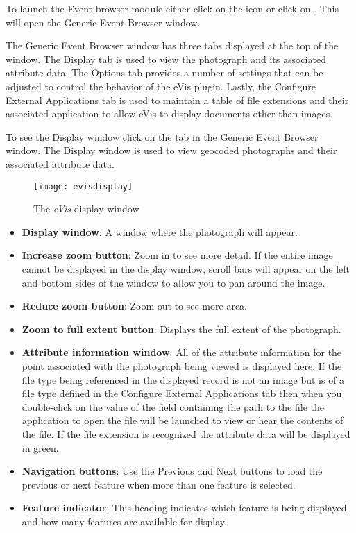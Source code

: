 To launch the Event browser module either click on the 
icon or click on  \arrow {} \arrow
{}. This will open the Generic Event Browser window.

The Generic Event Browser window has three tabs displayed at the top of the window. The Display tab
is used to view the photograph and its associated attribute data. The Options tab provides a number
of settings that can be adjusted to control the behavior of the eVis plugin. Lastly, the Configure
External Applications tab is used to maintain a table of file extensions and their associated
application to allow eVis to display documents other than images.

\label{evis_display_window}

To see the Display window click on the  tab in the Generic Event Browser
window. The Display window is used to view geocoded photographs and their associated attribute data.

\begin{figure}[ht]
   \centering
   \texttt{[image: evisdisplay]}
   \caption{The \emph{eVis} display window \wincaption}\label{evisdisplay}
\end{figure}

\begin{itemize}[label=--]
\item \textbf{Display window}: A window where the photograph will appear.
\item \textbf{Increase zoom button}: Zoom in to see more detail. If the entire image cannot be
displayed in the display window, scroll bars will appear on the left and bottom sides of the window
to allow you to pan around the image.
\item \textbf{Reduce zoom button}: Zoom out to see more area.
\item \textbf{Zoom to full extent button}: Displays the full extent of the photograph.
\item \textbf{Attribute information window}: All of the attribute information for the point
associated with the photograph being viewed is displayed here. If the file type being referenced in
the displayed record is not an image but is of a file type defined in the Configure External
Applications tab then when you double-click on the value of the field containing the path to the
file the application to open the file will be launched to view or hear the contents of the file. If
the file extension is recognized the attribute data will be displayed in green.
\item \textbf{Navigation buttons}: Use the Previous and Next buttons to load the previous or next
feature when more than one feature is selected.
\item \textbf{Feature indicator}: This heading indicates which feature is being displayed and how
many features are available for display.
\end{itemize}

